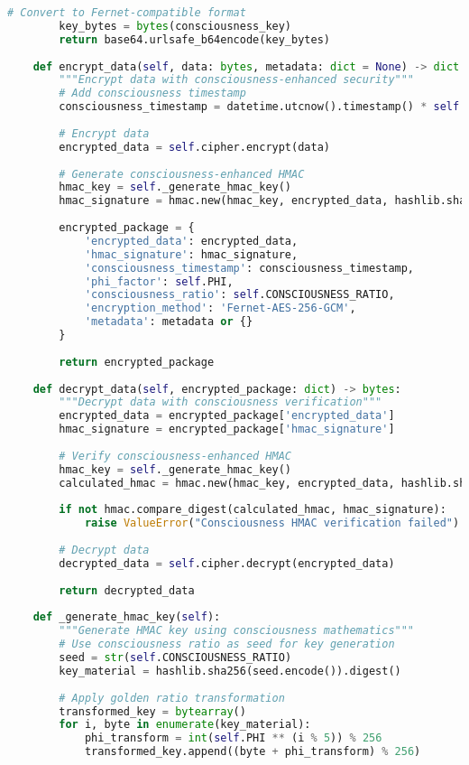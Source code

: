 \documentclass[11pt,a4paper]{article}
\begin{document}
\begin{lstlisting}[language=Python, caption=Enterprise Security Framework]
        # Convert to Fernet-compatible format
        key_bytes = bytes(consciousness_key)
        return base64.urlsafe_b64encode(key_bytes)
    
    def encrypt_data(self, data: bytes, metadata: dict = None) -> dict:
        """Encrypt data with consciousness-enhanced security"""
        # Add consciousness timestamp
        consciousness_timestamp = datetime.utcnow().timestamp() * self.PHI
        
        # Encrypt data
        encrypted_data = self.cipher.encrypt(data)
        
        # Generate consciousness-enhanced HMAC
        hmac_key = self._generate_hmac_key()
        hmac_signature = hmac.new(hmac_key, encrypted_data, hashlib.sha256).hexdigest()
        
        encrypted_package = {
            'encrypted_data': encrypted_data,
            'hmac_signature': hmac_signature,
            'consciousness_timestamp': consciousness_timestamp,
            'phi_factor': self.PHI,
            'consciousness_ratio': self.CONSCIOUSNESS_RATIO,
            'encryption_method': 'Fernet-AES-256-GCM',
            'metadata': metadata or {}
        }
        
        return encrypted_package
    
    def decrypt_data(self, encrypted_package: dict) -> bytes:
        """Decrypt data with consciousness verification"""
        encrypted_data = encrypted_package['encrypted_data']
        hmac_signature = encrypted_package['hmac_signature']
        
        # Verify consciousness-enhanced HMAC
        hmac_key = self._generate_hmac_key()
        calculated_hmac = hmac.new(hmac_key, encrypted_data, hashlib.sha256).hexdigest()
        
        if not hmac.compare_digest(calculated_hmac, hmac_signature):
            raise ValueError("Consciousness HMAC verification failed")
        
        # Decrypt data
        decrypted_data = self.cipher.decrypt(encrypted_data)
        
        return decrypted_data
    
    def _generate_hmac_key(self):
        """Generate HMAC key using consciousness mathematics"""
        # Use consciousness ratio as seed for key generation
        seed = str(self.CONSCIOUSNESS_RATIO)
        key_material = hashlib.sha256(seed.encode()).digest()
        
        # Apply golden ratio transformation
        transformed_key = bytearray()
        for i, byte in enumerate(key_material):
            phi_transform = int(self.PHI ** (i % 5)) % 256
            transformed_key.append((byte + phi_transform) % 256)
        

\end{lstlisting}
\end{document}
